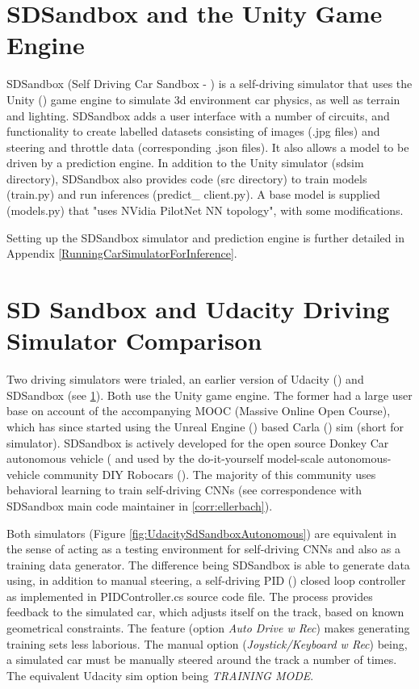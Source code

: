 \section{SDSandbox and the Unity Game Engine}
\label{met:sdsandboxAndUnity}
SDSandbox (Self Driving Car Sandbox - \cite{SDSandboxSim}) is a self-driving simulator that uses the Unity (\cite{haas2014history}) game engine to simulate 3d environment car physics, as well as terrain and lighting. SDSandbox adds a user interface with a number of circuits, and functionality to create labelled datasets consisting of images (.jpg files) and steering and throttle data (corresponding .json files). It also allows a model to be driven by a prediction engine. In addition to the Unity simulator (sdsim directory), SDSandbox also provides code (src directory) to train models (train.py) and run inferences (predict\_ client.py). A base model is supplied (models.py) that "uses NVidia PilotNet NN topology", with some modifications.  
  
Setting up the SDSandbox simulator and prediction engine is further detailed in Appendix \ref{RunningCarSimulatorForInference}.


\section{SD Sandbox and Udacity Driving Simulator Comparison}
\label{met:sdsandbox-udacity-comparison}
Two driving simulators were trialed, an earlier version of Udacity (\cite{UdacityCarSim}) and SDSandbox (see \ref{met:sdsandboxAndUnity}). Both use the Unity game engine. The former had a large user base on account of the accompanying MOOC (Massive Online Open Course), which has since started using the Unreal Engine (\cite{unrealengine}) based Carla (\cite{Dosovitskiy17}) sim (short for simulator). SDSandbox is actively developed for the open source Donkey Car autonomous vehicle (\cite{DonkeyCar2020} and used by the do-it-yourself model-scale autonomous-vehicle community DIY Robocars (\cite{DIYRobocars2020}). The majority of this community uses behavioral learning to train self-driving CNNs (see correspondence with SDSandbox main code maintainer in \ref{corr:ellerbach}).  
 
Both simulators (Figure \ref{fig:UdacitySdSandboxAutonomous}) are equivalent in the sense of acting as a testing environment for self-driving CNNs and also as a training data generator. The difference being SDSandbox is able to generate data using, in addition to manual steering, a self-driving PID (\cite{bennett1993development}) closed loop controller as implemented in PIDController.cs source code file. The process provides feedback to the simulated car, which adjusts itself on the track, based on known geometrical constraints. The feature (option \textit{Auto Drive w Rec}) makes generating training sets less laborious. The manual option (\textit{Joystick/Keyboard w Rec}) being, a simulated car must be manually steered around the track a number of times. The equivalent Udacity sim option being \textit{TRAINING MODE}.

